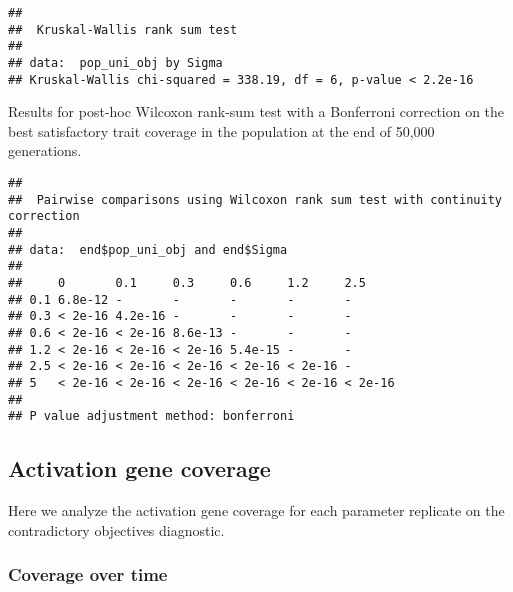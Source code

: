 \documentclass[]{book}
\newenvironment{Shaded}{\begin{snugshade}}{\end{snugshade}}
\newcommand{\DataTypeTok}[1]{\textcolor[rgb]{0.13,0.29,0.53}{#1}}
\newcommand{\KeywordTok}[1]{\textcolor[rgb]{0.13,0.29,0.53}{\textbf{#1}}}
\newcommand{\NormalTok}[1]{#1}
\newcommand{\OperatorTok}[1]{\textcolor[rgb]{0.81,0.36,0.00}{\textbf{#1}}}
\newcommand{\OtherTok}[1]{\textcolor[rgb]{0.56,0.35,0.01}{#1}}
\newcommand{\StringTok}[1]{\textcolor[rgb]{0.31,0.60,0.02}{#1}}
\begin{document}
\begin{verbatim}
## 
##  Kruskal-Wallis rank sum test
## 
## data:  pop_uni_obj by Sigma
## Kruskal-Wallis chi-squared = 338.19, df = 6, p-value < 2.2e-16
\end{verbatim}

Results for post-hoc Wilcoxon rank-sum test with a Bonferroni correction on the best satisfactory trait coverage in the population at the end of 50,000 generations.

\begin{Shaded}
\end{Shaded}

\begin{verbatim}
## 
##  Pairwise comparisons using Wilcoxon rank sum test with continuity correction 
## 
## data:  end$pop_uni_obj and end$Sigma 
## 
##     0       0.1     0.3     0.6     1.2     2.5    
## 0.1 6.8e-12 -       -       -       -       -      
## 0.3 < 2e-16 4.2e-16 -       -       -       -      
## 0.6 < 2e-16 < 2e-16 8.6e-13 -       -       -      
## 1.2 < 2e-16 < 2e-16 < 2e-16 5.4e-15 -       -      
## 2.5 < 2e-16 < 2e-16 < 2e-16 < 2e-16 < 2e-16 -      
## 5   < 2e-16 < 2e-16 < 2e-16 < 2e-16 < 2e-16 < 2e-16
## 
## P value adjustment method: bonferroni
\end{verbatim}

\hypertarget{activation-gene-coverage-8}{%
\subsection{Activation gene coverage}\label{activation-gene-coverage-8}}

Here we analyze the activation gene coverage for each parameter replicate on the contradictory objectives diagnostic.

\hypertarget{coverage-over-time-12}{%
\subsubsection{Coverage over time}\label{coverage-over-time-12}}
\end{document}
